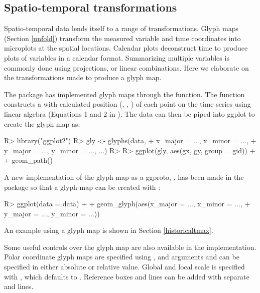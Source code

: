 \documentclass[
  shortnames]{jss}
\begin{document}
\hypertarget{st_transformation}{%
\subsection{Spatio-temporal transformations}\label{st_transformation}}

Spatio-temporal data lends itself to a range of transformations. Glyph maps (Section \ref{unfold}) transform the measured variable and time coordinates into microplots at the spatial locations. Calendar plots \citep{wang2020calendar} deconstruct time to produce plots of variables in a calendar format. Summarizing multiple variables is commonly done using projections, or linear combinations. Here we elaborate on the transformations made to produce a glyph map.

The package  \citep{ggally} has implemented glyph maps through the  function. The function constructs a  with calculated position (, , ) of each point on the time series using linear algebra (Equations 1 and 2 in \citet{Wickham2012-yr}). The data can then be piped into ggplot to create the glyph map as:

\begin{CodeChunk}
\begin{CodeInput}
R> library("ggplot2")
R> gly <- glyphs(data,
+               x_major = ..., x_minor = ...,
+               y_major = ..., y_minor = ..., ...)
R> 
R> ggplot(gly, aes(gx, gy, group = gid)) +
+   geom_path()
\end{CodeInput}
\end{CodeChunk}

A new implementation of the glyph map as a ggproto, , has been made in the  package so that a glyph map can be created with :

\begin{CodeChunk}
\begin{CodeInput}
R> ggplot(data = data) +
+   geom_glyph(aes(x_major = ..., x_minor = ...,
+                  y_major = ..., y_minor = ...))
\end{CodeInput}
\end{CodeChunk}

An example using a glyph map is shown in Section \ref{historicaltmax}.

Some useful controls over the glyph map are also available in the  implementation. Polar coordinate glyph maps are specified using , and arguments  and  can be specified in either absolute or relative value. Global and local scale is specified with , which defaults to . Reference boxes and lines can be added with separate  and  lines.
\end{document}
